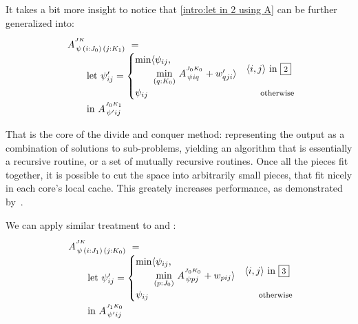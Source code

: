 \medskip
It takes a bit more insight to notice that \eqref{intro:let in 2 using A} can be further
generalized into:
%
\begin{equation}\LeftEqNo
\renewcommand\arraystretch{1.5}
\begin{array}{l@{}l}
	A^{^{JK}}_{\,\psi\,(i : J_0)\,(j : K_1)} ~=~ \\
	\qquad
	\textrm{let}~\psi'_{ij} = \begin{cases}
	  \begin{array}{@{}l@{}l@{}}\min\langle & \psi_{ij}, \\ & \!\underset{(q:K_0)}\min ~ A^{^{J_0K_0}}_{\,\psi iq} + w'_{qji}\rangle\end{array} & \langle i,j\rangle\mbox{ in }\qbox2 \\
	  \psi_{ij} & \otherwise
	\end{cases} \\
	\qquad\textrm{in}~
	A^{^{J_0K_1}}_{\,\psi' ij}
\end{array}
\label{intro:let in A 2}
\end{equation}

That is the core of the divide and conquer method: representing the output as a combination
of solutions to sub-problems, yielding an algorithm that is essentially
a recursive routine, or a set of mutually recursive routines. 
Once all the pieces fit together, it is possible to cut the space into arbitrarily small pieces,
that fit nicely in each core's local cache. This greately increases performance, as demonstrated
by~. 

\medskip
We can apply similar treatment to  and :
%
\begin{equation}\LeftEqNo
\renewcommand\arraystretch{1.5}
\begin{array}{l@{}l}
	A^{^{JK}}_{\,\psi\,(i : J_1)\,(j : K_0)} ~=~ \\
	\qquad
	\textrm{let}~\psi'_{ij} = \begin{cases} 
	  \begin{array}{@{}l@{}l@{}}\min\langle & \psi_{ij}, \\ & \!\underset{(p:J_0)}\min ~ A^{^{J_0K_0}}_{\,\psi pj} + w_{pij}\rangle \end{array} & \langle i,j\rangle\mbox{ in }\qbox3 \\
	  \psi_{ij} & \otherwise \\
	\end{cases} \\
	\qquad\textrm{in}~
	A^{^{J_1K_0}}_{\,\psi' ij}
\end{array}
\label{intro:let in A 3}
\end{equation}

